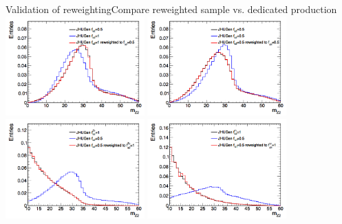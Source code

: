 \documentclass[usenames,dvipsnames,svgnames,table]{beamer}
\begin{document}
\begin{frame}{Validation of reweighting}{Compare reweighted sample vs. dedicated production}
\centering
\includegraphics[width=0.4\textwidth]{reweightingvalidation/fa2halffa31} %
\includegraphics[width=0.4\textwidth]{reweightingvalidation/fa2halffa3half}\\
\includegraphics[width=0.4\textwidth]{reweightingvalidation/fa2Zgamma} %
\includegraphics[width=0.4\textwidth]{reweightingvalidation/flambda1fa3Zgamma}
\end{frame}
\end{document}
